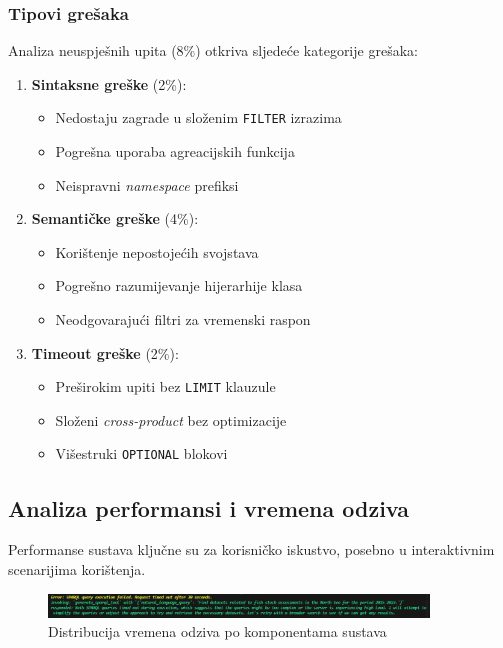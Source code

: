 \subsubsection{Tipovi grešaka}

Analiza neuspješnih upita (8\%) otkriva sljedeće kategorije grešaka:

\begin{enumerate}
    \item \textbf{Sintaksne greške} (2\%):
    \begin{itemize}
        \item Nedostaju zagrade u složenim \texttt{FILTER} izrazima
        \item Pogrešna uporaba agreacijskih funkcija
        \item Neispravni \textit{namespace} prefiksi
    \end{itemize}
    
    \item \textbf{Semantičke greške} (4\%):
    \begin{itemize}
        \item Korištenje nepostojećih svojstava
        \item Pogrešno razumijevanje hijerarhije klasa
        \item Neodgovarajući filtri za vremenski raspon
    \end{itemize}
    
    \item \textbf{Timeout greške} (2\%):
    \begin{itemize}
        \item Preširokim upiti bez \texttt{LIMIT} klauzule
        \item Složeni \textit{cross-product} bez optimizacije
        \item Višestruki \texttt{OPTIONAL} blokovi
    \end{itemize}
\end{enumerate}

\subsection{Analiza performansi i vremena odziva}

Performanse sustava ključne su za korisničko iskustvo, posebno u interaktivnim scenarijima korištenja.

\begin{figure}[htbp]
    \centering
    \includegraphics[width=0.9\textwidth]{figures/izvjestaj_image_62.png}
    \caption{Distribucija vremena odziva po komponentama sustava}
    \label{fig:response_time_breakdown}
\end{figure}

